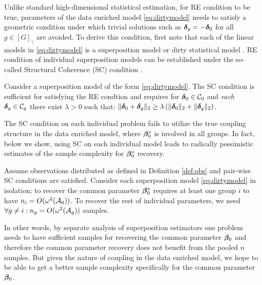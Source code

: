Unlike standard high-dimensional statistical estimation, for RE condition to be true, parameters of the data enriched model \eqref{eq:dirtymodel} needs to satisfy a geometric condition under which trivial solutions such as $\boldsymbol{\delta}_g=-\boldsymbol{\delta}_0$ for all $g \in [G]_\setminus$ are avoided.
To derive this condition, first note that each of the linear models in \eqref{eq:dirtymodel} is a superposition model \cite{guba16} or dirty statistical model \cite{yara13}. RE condition of individual superposition models can be established under the so-called Structural Coherence (SC) condition \cite{guba16, mctr13}. 
\begin{definition} \label{scc}
	Consider a superposition model of the form \eqref{eq:dirtymodel}. The SC condition is sufficient for satisfying the RE condtion and requires for $\boldsymbol{\delta}_0 \in {\cal C}_0$ and {\em each} $\boldsymbol{\delta}_g \in {\cal C}_g$ there exist $\lambda > 0$ such that: $\|\boldsymbol{\delta}_0 + \boldsymbol{\delta}_g\|_{2} \geq  \lambda \left(\|\boldsymbol{\delta}_0\|_{2} + \|\boldsymbol{\delta}_g\|_{2} \right)$.
\end{definition}
The SC condition on each individual problem fails to utilize the true coupling structure in the data enriched model, where $\boldsymbol{\beta}^*_0$ is involved in all groups. In fact, below we show, using SC on each individual model leads to radically pessimistic estimates of the sample complexity for $\boldsymbol{\beta}^*_0$ recovery.
\begin{prop}
	\label{prop:super}
	Assume observations distributed as defined in Definition \ref{def:obs} and pair-wise SC conditions are satisfied.  Consider each superposition model \eqref{eq:dirtymodel} in isolation; to recover the common parameter $\boldsymbol{\beta} _0^*$ requires at least one group $i$ to have $n_i = O(\omega^2({\cal A}_0))$. 
	To recover the rest of individual parameters, we need $\forall g \neq i: n_g = O(\omega^2({\cal A}_g))$ samples. 
\end{prop}
In other words, by separate analysis of superposition estimators one problem needs to have sufficient samples for recovering the common parameter $\boldsymbol{\beta}_0$ and therefore the common parameter recovery does not benefit from the pooled $n$ samples.
But given the nature of coupling in the data enriched model, we hope to be able to get a better sample complexity specifically for the common parameter $\boldsymbol{\beta}_0$.

